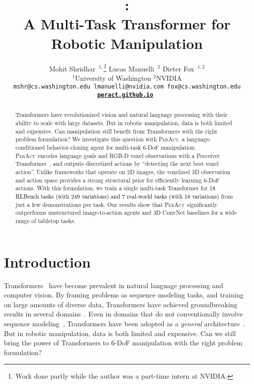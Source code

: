 \documentclass{article}
\title{\modelfullns: \\ A Multi-Task Transformer for Robotic Manipulation}
\author{ Mohit Shridhar~$^{1,}$\thanks{Work done partly while the author was a part-time intern at NVIDIA.}\hspace{8px} Lucas Manuelli~$^2$ \hspace{4px}  Dieter Fox~$^{1, 2}$\\
$^1$University of Washington \hspace{6px} $^2$NVIDIA\\
\tt\small mshr@cs.washington.edu \hspace{2px} lmanuelli@nvidia.com \hspace{2px} fox@cs.washington.edu\\[1em]
\large\textbf{\url{peract.github.io}}
}
\newcommand{\highlight}[1]{\textcolor{black}{#1}}
\newcommand{\model}{\textsc{PerAct}}
\begin{document}
\maketitle


\vspace{-1.0cm}
\begin{abstract}
    Transformers have revolutionized vision and natural language processing with their ability to scale with large datasets. But in robotic manipulation, data is both limited and expensive.  
    Can manipulation still benefit from Transformers with the right problem formulation?
    We investigate this question with \model, a language-conditioned behavior-cloning agent for multi-task 6-DoF manipulation. 
    \model~encodes language goals and RGB-D voxel observations with a Perceiver Transformer~\citep{jaegle2021perceiver}, and outputs discretized actions by ``detecting the next best voxel action''. 
    Unlike frameworks that operate on 2D images, the voxelized 3D  observation and action space provides a strong structural prior for efficiently learning 6-DoF actions.
    With this formulation, we train a single multi-task Transformer for \highlight{18 RLBench tasks (with 249 variations) and 7 real-world tasks (with 18 variations)} from just a few demonstrations per task.
    Our results show that \model~significantly outperforms unstructured image-to-action agents and 3D ConvNet baselines for a wide range of tabletop tasks.  
    
    
\end{abstract}



\section{Introduction}

Transformers~\citep{vaswani2017attention} have become  prevalent in natural language processing and computer vision. By framing problems as sequence modeling tasks, and training on large amounts of diverse data, Transformers have achieved groundbreaking results in several domains~\citep{brown2020language,dosovitskiy2020image,jumper2021highly,vinyals2019alphastar}. Even in domains that do not conventionally involve sequence modeling~\citep{chen2021pix2seq,chen2021decision}, Transformers have been adopted as a \textit{general} architecture~\citep{reed2022generalist}. But in robotic manipulation, data is both limited and expensive. 
Can we still bring the power of Transformers to 6-DoF manipulation with the right problem formulation?
\end{document}
